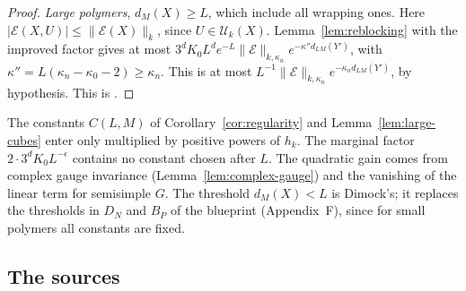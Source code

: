 \begin{proof}
\emph{Large polymers}, $d_M(X)\ge L$, which include all wrapping ones. Here $|\mathcal E(X,U)|\le\|\mathcal E(X)\|_k$, since $U\in\mathcal U_k(X)$. Lemma~\ref{lem:reblocking} with the improved factor gives at most $3^dK_0L^de^{-L}\|\mathcal E\|_{k,\kappa_n}e^{-\kappa''d_{LM}(Y')}$, with $\kappa''=L(\kappa_n-\kappa_0-2)\ge\kappa_n$. This is at most $L^{-1}\|\mathcal E\|_{k,\kappa_n}e^{-\kappa_nd_{LM}(Y')}$, by hypothesis. This is \cite[(139)--(140)]{DimockI}.
\end{proof}

\begin{remark}\label{rem:linear-uses}
The constants $C(L,M)$ of Corollary~\ref{cor:regularity} and Lemma~\ref{lem:large-cubes} enter only multiplied by positive powers of $h_k$. The marginal factor $2\cdot3^dK_0L^{-\epsilon}$ contains no constant chosen after $L$. The quadratic gain comes from complex gauge invariance (Lemma~\ref{lem:complex-gauge}) and the vanishing of the linear term for semisimple $G$. The threshold $d_M(X)<L$ is Dimock's; it replaces the thresholds in $D_N$ and $B_P$ of the blueprint (Appendix~F), since for small polymers all constants are fixed.
\end{remark}

\subsection{The sources}\label{subsec:flow-sources}

